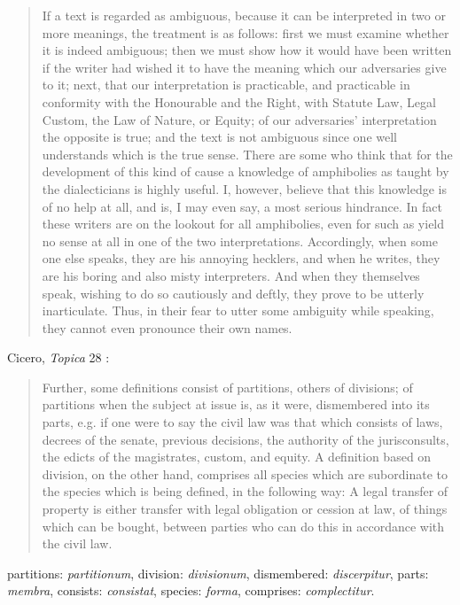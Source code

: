 \documentclass{article}
\begin{document}
\begin{quote}
If a text is regarded as ambiguous, because it can be interpreted in two or more meanings, the treatment is as follows: first we must examine whether it is indeed ambiguous; then we must show how it would have been written if the writer had wished it to have the meaning which our adversaries give to it; next, that our interpretation is practicable, and practicable in conformity with the Honourable and the Right, with Statute Law, Legal Custom, the Law of Nature, or Equity; of our adversaries' interpretation the opposite is true; and the text is not ambiguous since one well understands which is the true sense. There are some who think that for the development of this kind of cause a knowledge of amphibolies as taught by the dialecticians is highly useful. I, however, believe that this knowledge is of no help at all, and is, I may even say, a most serious hindrance. In fact these writers are on the lookout for all amphibolies, even for such as yield no sense at all in one of the two interpretations. Accordingly, when some one else speaks, they are his annoying hecklers, and when he writes, they are his boring and also misty interpreters. And when they themselves speak, wishing to do so cautiously and deftly, they prove to be utterly inarticulate. Thus, in their fear to utter some ambiguity while speaking, they cannot even pronounce their own names.
\end{quote}

Cicero, {\em Topica} 28 \cite[p.~129]{reinhardt}:

\begin{quote}
Further, some definitions consist of partitions, others of 
divisions; of partitions when the subject at issue is, as it were,
dismembered into its parts, e.g. if one were to say the civil law
was that which consists of laws, decrees of the senate, previous
decisions, the authority of the jurisconsults, the edicts of the
magistrates, custom, and equity. A definition based on division,
on the other hand, comprises all species which are subordinate to
the species which is being defined, in the following way: A legal
transfer of property is either transfer with legal obligation or
cession at law, of things which can be bought, between parties
who can do this in accordance with the civil law.
\end{quote}

partitions: {\em partitionum}, division: {\em divisionum}, dismembered: {\em discerpitur}, parts: {\em membra},
consists: {\em consistat}, species: {\em forma},
comprises: {\em complectitur}.
\end{document}
